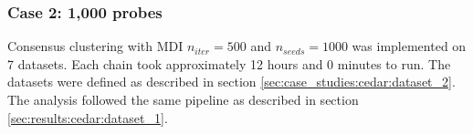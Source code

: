 \documentclass[12pt]{article} %
\begin{document}
	
%	
	
	\subsubsection{Case 2: 1,000 probes} \label{sec:results:cedar:dataset_2}
	Consensus clustering with MDI $n_{iter}=500$ and $n_{seeds}=1000$ was implemented on 7 datasets. Each chain took approximately 12 hours and 0 minutes to run. The datasets were defined as described in section \ref{sec:case_studies:cedar:dataset_2}. The analysis followed the same pipeline as described in section \ref{sec:results:cedar:dataset_1}.
	
\end{document}
